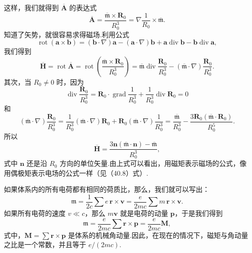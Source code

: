 这样，我们就得到 $\overline{\boldsymbol{A}}$ 的表达式
\begin{equation}
  \overline{\boldsymbol{A}}
  =\frac{\overline{\mathfrak{m}}\times\boldsymbol{R}_0}{R_0^3}
  =\nabla\frac{1}{R_0}\times\overline{\mathfrak{m}}.
\end{equation}
知道了矢势，就很容易求得磁场.利用公式
\begin{equation*}
  \operatorname{rot}(\boldsymbol{a}\times\boldsymbol{b})
  =(\boldsymbol{b}\cdot\nabla)\boldsymbol{a}
  -(\boldsymbol{a}\cdot\nabla)\boldsymbol{b}
  +\boldsymbol{a}\operatorname{div}\boldsymbol{b}
  -\boldsymbol{b}\operatorname{div}\boldsymbol{a},
\end{equation*}
我们得到
\begin{equation*}
  \overline{\boldsymbol{H}}=\operatorname{rot}\overline{\boldsymbol{A}}
  =\operatorname{rot}\left(\frac{\overline{\mathfrak{m}}\times\boldsymbol{R}_0}{R_0^3}\right)
  =\overline{\mathfrak{m}}\operatorname{div}\frac{\boldsymbol{R}_0}{R_0^3}
  -(\overline{\mathfrak{m}}\cdot\nabla)\frac{\boldsymbol{R}_0}{R_0^3}.
\end{equation*}
其次，当 $R_0\neq 0$ 时，因为
\begin{equation*}
  \operatorname{div}\frac{\boldsymbol{R}_0}{R_0^3}
  =\boldsymbol{R}_0\cdot\operatorname{grad}\frac{1}{R_0^3}
  +\frac{1}{R_0^3}\operatorname{div}\boldsymbol{R}_0=0
\end{equation*}
和
\begin{equation*}
  (\overline{\mathfrak{m}}\cdot\nabla)\frac{\boldsymbol{R}_0}{R_0^3}
  =\frac{1}{R_0^3}(\overline{\mathfrak{m}}\cdot\nabla)\boldsymbol{R}_0
  +\boldsymbol{R}_0(\overline{\mathfrak{m}}\cdot\nabla)\frac{1}{R_0^3}
  =\frac{\overline{\mathfrak{m}}}{R_0^3}
  -\frac{3\boldsymbol{R}_0(\overline{\mathfrak{m}}\cdot\boldsymbol{R}_0)}{R_0^5}.
\end{equation*}
所以
\begin{equation}
  \overline{\boldsymbol{H}}
  =\frac{3\boldsymbol{n}(\overline{\mathfrak{m}}\cdot\boldsymbol{n})
  -\overline{\mathfrak{m}}}{R_0^3},
\end{equation}
式中 $\boldsymbol{n}$ 还是沿 $R_0$ 方向的单位矢量.由上式可以看出，用磁矩表示磁场的公式，像用偶极矩表示电场的公式一样（见（40.8）式）.

如果体系内的所有电荷都有相同的荷质比，那么，我们就可以写出：
\begin{equation*}
  \mathfrak{m}=\frac{1}{2c}\sum e\,\boldsymbol{r}\times\boldsymbol{v}
  =\frac{e}{2mc}\sum m\,\boldsymbol{r}\times\boldsymbol{v}.
\end{equation*}
如果所有电荷的速度 $v\ll c$，那么 $m\boldsymbol{v}$ 就是电荷的动量 $\boldsymbol{p}$，于是我们得到
\begin{equation}
  \mathfrak{m}=\frac{e}{2mc}\sum\boldsymbol{r}\times\boldsymbol{p}
  =\frac{e}{2mc}\boldsymbol{M},
\end{equation}
式中，$\boldsymbol{M}=\sum\boldsymbol{r}\times\boldsymbol{p}$ 是体系的机械角动量.因此，在现在的情况下，磁矩与角动量之比是一个常数，并且等于 $e/(2mc)$.

